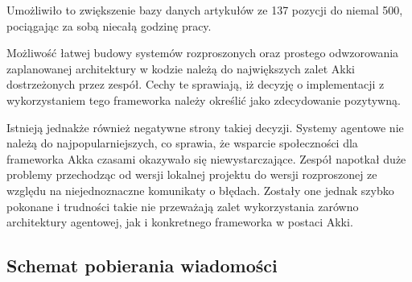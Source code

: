 Umożliwiło to zwiększenie bazy danych artykułów ze 137 pozycji do niemal 500, pociągając za sobą niecałą godzinę pracy.
\par Możliwość łatwej budowy systemów rozproszonych oraz prostego odwzorowania zaplanowanej architektury w kodzie należą do największych zalet Akki dostrzeżonych przez zespół. Cechy te sprawiają, iż decyzję o implementacji z wykorzystaniem tego frameworka należy określić jako zdecydowanie pozytywną.
\par Istnieją jednakże również negatywne strony takiej decyzji. Systemy agentowe nie należą do najpopularniejszych, co sprawia, że wsparcie społeczności dla frameworka Akka czasami okazywało się niewystarczające. Zespół napotkał duże problemy przechodząc od wersji lokalnej projektu do wersji rozproszonej ze względu na niejednoznaczne komunikaty o błędach. Zostały one jednak szybko pokonane i trudności takie nie przeważają zalet wykorzystania zarówno architektury agentowej, jak i konkretnego frameworka w postaci Akki.

\subsection{Schemat pobierania wiadomości}